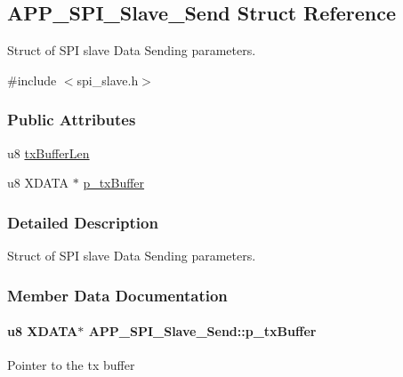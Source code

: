\hypertarget{struct_a_p_p___s_p_i___slave___send}{}\subsection{A\+P\+P\+\_\+\+S\+P\+I\+\_\+\+Slave\+\_\+\+Send Struct Reference}
\label{struct_a_p_p___s_p_i___slave___send}


Struct of S\+PI slave Data Sending parameters.  




{\ttfamily \#include $<$spi\+\_\+slave.\+h$>$}

\subsubsection*{Public Attributes}
\begin{DoxyCompactItemize}
\item 
u8 \hyperlink{struct_a_p_p___s_p_i___slave___send_aa5815761e8a3218cf21c493003b7555a}{tx\+Buffer\+Len}
\item 
u8 X\+D\+A\+TA $\ast$ \hyperlink{struct_a_p_p___s_p_i___slave___send_a6b8081fd43896ac25829ca23a3e564f8}{p\+\_\+tx\+Buffer}
\end{DoxyCompactItemize}


\subsubsection{Detailed Description}
Struct of S\+PI slave Data Sending parameters. 

\subsubsection{Member Data Documentation}
\paragraph[{\texorpdfstring{p\+\_\+tx\+Buffer}{p_txBuffer}}]{\setlength{\rightskip}{0pt plus 5cm}u8 X\+D\+A\+TA$\ast$ A\+P\+P\+\_\+\+S\+P\+I\+\_\+\+Slave\+\_\+\+Send\+::p\+\_\+tx\+Buffer}\hypertarget{struct_a_p_p___s_p_i___slave___send_a6b8081fd43896ac25829ca23a3e564f8}{}\label{struct_a_p_p___s_p_i___slave___send_a6b8081fd43896ac25829ca23a3e564f8}
Pointer to the tx buffer 
